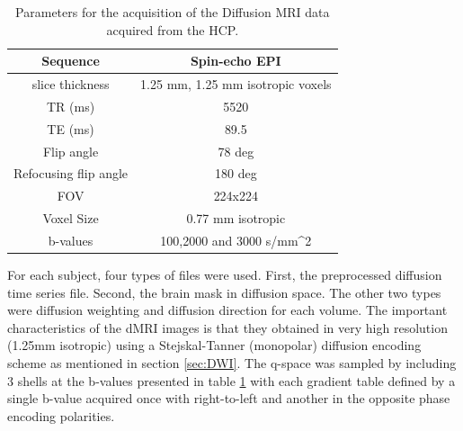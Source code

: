 \documentclass[msthesis.tex]{subfiles}
\begin{document}
\begin{table}[]
\centering
    \begin{tabular}{|c|c|}
         \hline
         Sequence &  Spin-echo EPI \\
         \hline
         slice thickness & 1.25 mm, 1.25 mm isotropic voxels\\
          \hline
         TR (ms) & 5520  \\
          \hline
         TE (ms) & 89.5 \\
          \hline
         Flip angle & 78 deg \\
          \hline
         Refocusing flip angle & 180 deg \\
          \hline
         FOV & 224x224 \\
          \hline
         Voxel Size & 0.77 mm isotropic \\
          \hline
         b-values & 100,2000 and 3000 s/mm^2\\
         \hline
    \end{tabular}
    \caption{Parameters for the acquisition of the Diffusion MRI data acquired from the HCP.}
    \label{tab:diffusionmripara}
\end{table}
For each subject, four types of files were used. First, the preprocessed diffusion time series file. Second, the brain mask in diffusion space. The other two types were diffusion weighting and diffusion direction for each volume. The important characteristics of the dMRI images is that they obtained in very high resolution (1.25mm isotropic) using a Stejskal-Tanner (monopolar) diffusion encoding scheme as mentioned in section \ref{sec:DWI}. The q-space was sampled by including 3 shells at the b-values presented in table \ref{tab:diffusionmripara} with each gradient table defined by a single b-value acquired once with right-to-left and another in the opposite phase encoding polarities. 
\end{document}
